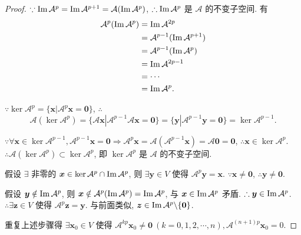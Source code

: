 \documentclass{ctexart}
\begin{document}
\begin{proof}
    $\because\operatorname{Im} \mathcal{A}^p=\operatorname{Im} \mathcal{A}^{p+1}=\mathcal{A}(\operatorname{Im} \mathcal{A}^p)$, $\therefore\operatorname{Im} \mathcal{A}^p$ 是 $\mathcal{A}$ 的不变子空间. 有
    \begin{align*}
        \mathcal{A}^p(\operatorname{Im} \mathcal{A}^p) & =\operatorname{Im} \mathcal{A}^{2p} \\
        & =\mathcal{A}^{p-1}(\operatorname{Im} \mathcal{A}^{p+1}) \\
        & =\mathcal{A}^{p-1}(\operatorname{Im} \mathcal{A}^p) \\
        & =\operatorname{Im} \mathcal{A}^{2p-1} \\
        & =\cdots \\
        & =\operatorname{Im} \mathcal{A}^p.
    \end{align*}

    $\because\ker\mathcal{A}^p=\{\boldsymbol{x}|\mathcal{A}^p\boldsymbol{x}=\boldsymbol{0}\}$, $\therefore$
    \begin{equation}\label{ex3.3eq}
        \mathcal{A}(\ker\mathcal{A}^p)=\{\mathcal{A}\boldsymbol{x}|\mathcal{A}^{p-1}\mathcal{A}\boldsymbol{x}=\boldsymbol{0}\}=\{\boldsymbol{y}|\mathcal{A}^{p-1}\boldsymbol{y}=\boldsymbol{0}\}=\ker\mathcal{A}^{p-1}.
    \end{equation}

    $\because\forall\boldsymbol{x}\in\ker\mathcal{A}^{p-1},\mathcal{A}^{p-1}\boldsymbol{x}=\boldsymbol{0}\Rightarrow\mathcal{A}^p\boldsymbol{x}=\mathcal{A}(\mathcal{A}^{p-1}\boldsymbol{x})=\mathcal{A}\boldsymbol{0}=\boldsymbol{0}$, $\therefore\boldsymbol{x}\in\ker\mathcal{A}^p$. $\therefore\mathcal{A}(\ker\mathcal{A}^p)\subset\ker\mathcal{A}^p$, 即 $\ker\mathcal{A}^p$ 是 $\mathcal{A}$ 的不变子空间.

    假设 $\exists$ 非零的 $\boldsymbol{x}\in\ker\mathcal{A}^p\cap\operatorname{Im} \mathcal{A}^p$, 则 $\exists\boldsymbol{y}\in V$ 使得 $\mathcal{A}^p\boldsymbol{y}=\boldsymbol{x}$. $\because\boldsymbol{x}\neq\boldsymbol{0}$, $\therefore\boldsymbol{y}\neq\boldsymbol{0}$.

    假设 $\boldsymbol{y}\notin\operatorname{Im} \mathcal{A}^p$, 则 $\boldsymbol{x}\notin\mathcal{A}^p(\operatorname{Im} \mathcal{A}^p)=\operatorname{Im} \mathcal{A}^p$, 与 $\boldsymbol{x}\in\operatorname{Im} \mathcal{A}^p$ 矛盾. $\therefore\boldsymbol{y}\in\operatorname{Im} \mathcal{A}^p$. $\therefore\exists\boldsymbol{z}\in V$ 使得 $\mathcal{A}^p\boldsymbol{z}=\boldsymbol{y}$. 与前面类似, $\boldsymbol{z}\in\operatorname{Im} \mathcal{A}^p\backslash\{\boldsymbol{0}\}$.

    重复上述步骤得 $\exists\boldsymbol{x}_0\in V$ 使得 $\mathcal{A}^{kp}\boldsymbol{x}_0\neq\boldsymbol{0}\ (k=0,1,2,\cdots,n),\mathcal{A}^{(n+1)p}\boldsymbol{x}_0=0$.


\end{proof}
\end{document}
